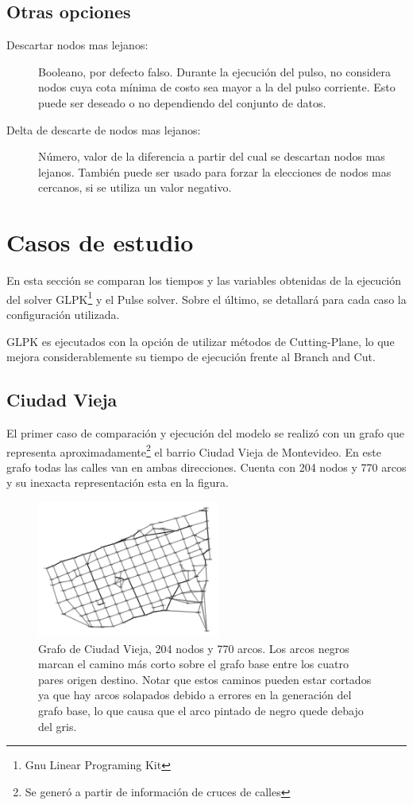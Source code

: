 \documentclass{article}
\begin{document}
  \subsection*{Otras opciones}

  \begin{description}
    \item[Descartar nodos mas lejanos:] Booleano, por defecto falso. Durante la ejecución del pulso, no considera nodos cuya cota mínima de costo sea mayor a la del pulso corriente. Esto puede ser deseado o no dependiendo del conjunto de datos.
    \item[Delta de descarte de nodos mas lejanos:] Número, valor de la diferencia a partir del cual se descartan nodos mas lejanos. También puede ser usado para forzar la elecciones de nodos mas cercanos, si se utiliza un valor negativo.
  \end{description}

  \section*{Casos de estudio}

  En esta sección se comparan los tiempos y las variables obtenidas de la ejecución del solver GLPK\footnote{Gnu Linear Programing Kit} y el Pulse solver. Sobre el último, se detallará para cada caso la configuración utilizada.

  GLPK es ejecutados con la opción de utilizar métodos de Cutting-Plane, lo que mejora considerablemente su tiempo de ejecución frente al Branch and Cut.

  \subsection*{Ciudad Vieja}

  El primer caso de comparación y ejecución del modelo se realizó con un grafo que representa aproximadamente\footnote{Se generó a partir de información de cruces de calles} el barrio Ciudad Vieja de Montevideo. En este grafo todas las calles van en ambas direcciones. Cuenta con 204 nodos y 770 arcos y su inexacta representación esta en la figura.

  \begin{figure}[h!]
    \centering
    \includegraphics[width=6cm]{imgs/mdeo_med_base.png}
    \caption{Grafo de Ciudad Vieja, 204 nodos y 770 arcos. Los arcos negros marcan el camino más corto sobre el grafo base entre los cuatro pares origen destino. Notar que estos caminos pueden estar cortados ya que hay arcos solapados debido a errores en la generación del grafo base, lo que causa que el arco pintado de negro quede debajo del gris.}
    \label{ciudadvieja}
  \end{figure}
\end{document}
